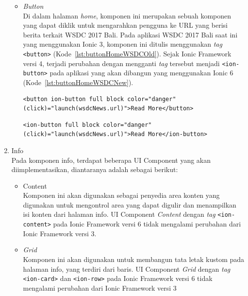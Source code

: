 \begin{enumerate}
\begin{itemize}
			\item \textit{Button} \\
			Di dalam halaman \textit{home}, komponen ini merupakan sebuah komponen yang dapat diklik untuk mengarahkan pengguna ke URL yang berisi berita terkait WSDC 2017 Bali. Pada aplikasi WSDC 2017 Bali saat ini yang menggunakan Ionic 3, komponen ini ditulis menggunakan \textit{tag} \texttt{<button>} (Kode~\ref{lst:buttonHomeWSDCOld}). Sejak Ionic Framework versi 4, terjadi perubahan dengan mengganti \textit{tag} tersebut menjadi \texttt{<ion-button>} pada aplikasi yang akan dibangun yang menggunakan Ionic 6 (Kode~\ref{lst:buttonHomeWSDCNew}).
			\newpage
\begin{lstlisting}[label={lst:buttonHomeWSDCOld}, caption=\textit{Button} dengan Ionic 3 di Aplikasi WSDC 2017 Bali Saat Ini]
<button ion-button full block color="danger" (click)="launch(wsdcNews.url)">Read More</button>
\end{lstlisting}

\begin{lstlisting}[label={lst:buttonHomeWSDCNew}, caption=\textit{Button} dengan Ionic 6 di Aplikasi WSDC 2017 Bali yang Akan dibuat]
<ion-button full block color="danger" (click)="launch(wsdcNews.url)">Read More</ion-button>
\end{lstlisting}
			
		\end{itemize}
		
	\item Info \\
	Pada komponen info, terdapat beberapa UI Component yang akan diimplementasikan, diantaranya adalah sebagai berikut:
		\begin{itemize}
			\item Content \\
		Komponen ini akan digunakan sebagai penyedia area konten yang digunakan untuk mengontrol area yang dapat digulir dan menampilkan isi konten dari halaman info. UI Component \textit{Content} dengan \textit{tag} \texttt{<ion-content>} pada Ionic Framework versi 6 tidak mengalami perubahan dari Ionic Framework versi 3.
		
			\item \textit{Grid} \\
		Komponen ini akan digunakan untuk membangun tata letak kustom pada halaman info, yang terdiri dari baris. UI Component \textit{Grid} dengan \textit{tag} \texttt{<ion-card>} dan \texttt{<ion-row>} pada Ionic Framework versi 6 tidak mengalami perubahan dari Ionic Framework versi 3
		\end{itemize}
		

\end{enumerate}
